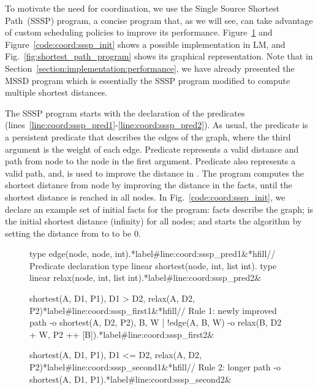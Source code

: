 To motivate the need for coordination, we use the Single Source Shortest
Path~(SSSP) program, a concise program that, as we will see, can take advantage
of custom scheduling policies to improve its performance.
Figure~\ref{code:shortest_path_program} and Figure~\ref{code:coord:sssp_init}
shows a possible implementation in LM, and Fig.~\ref{fig:shortest_path_program}
shows its graphical representation. Note that in
Section~\ref{section:implementation:performance}, we have already presented the
MSSD program which is essentially the SSSP program modified to compute multiple
shortest distances.

The SSSP program starts with the declaration of the predicates~
(lines~\ref{line:coord:sssp_pred1}-\ref{line:coord:sssp_pred2}). As usual, the
 predicate is a persistent predicate that describes the edges of the
graph, where the third argument is the weight of each edge. Predicate
 represents a valid distance and path from node  to the
node in the first argument.  Predicate  also represents a valid
path, and, is used to improve the distance in .  The program
computes the shortest distance from node  by improving the distance in
the  facts, until the shortest distance is reached in all nodes.
In Fig.~\ref{code:coord:sssp_init}, we declare an example set of initial facts
for the program:  facts describe the graph;  is the initial shortest distance (infinity) for all nodes; and
 starts the algorithm by setting the distance from
 to  to be 0.

\begin{figure}[ht]
\begin{LineCode}[commandchars=\*\#\&]
type edge(node, node, int).*label#line:coord:sssp_pred1&*hfill// Predicate declaration
type linear shortest(node, int, list int).
type linear relax(node, int, list int).*label#line:coord:sssp_pred2&

shortest(A, D1, P1), D1 > D2, relax(A, D2, P2)*label#line:coord:sssp_first1&*hfill// Rule 1: newly improved path
   -o shortest(A, D2, P2),
      {B, W | !edge(A, B, W) -o relax(B, D2 + W, P2 ++ [B])}.*label#line:coord:sssp_first2&

shortest(A, D1, P1), D1 <= D2, relax(A, D2, P2)*label#line:coord:sssp_second1&*hfill// Rule 2: longer path
   -o shortest(A, D1, P1).*label#line:coord:sssp_second2&
\end{LineCode}
\label{code:shortest_path_program}
\end{figure}

